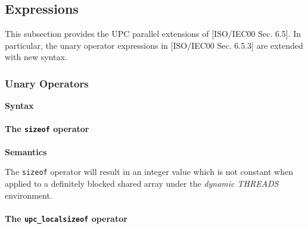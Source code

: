 \subsection{Expressions}

\npf This subsection provides the UPC parallel extensions of
    [ISO/IEC00 Sec. 6.5].  In particular, the unary operator expressions
    in [ISO/IEC00 Sec. 6.5.3] are extended with new syntax.

\subsubsection{Unary Operators}

{\bf Syntax}


\hspace{3em}{\em ...}










\paragraph{The {\tt\bf sizeof} operator}

{\bf Semantics} 

\npf The {\tt sizeof} operator will result in an
    integer value which is not constant when 
    applied to a definitely blocked shared array under
    the {\em dynamic THREADS} environment.

\paragraph{The {\tt\bf upc\_localsizeof} operator}
 
